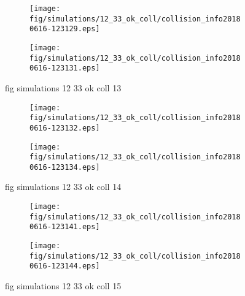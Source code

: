 \begin{figure}[H]
	\centering
	\begin{subfigure}[b]{0.8\textwidth}
		\texttt{[image: fig/simulations/12\_33\_ok\_coll/collision\_info20180616-123129.eps]}
		\caption{}
		\label{fig:simulations:12_33_ok_coll:collision_info20180616-123129}
	\end{subfigure}

	\begin{subfigure}[b]{0.8\textwidth}
		\texttt{[image: fig/simulations/12\_33\_ok\_coll/collision\_info20180616-123131.eps]}
		\caption{}
		\label{fig:simulations:12_33_ok_coll:collision_info20180616-123131}
	\end{subfigure}
	\caption{fig simulations 12 33 ok coll 13}
	\label{fig:simulations:12_33_ok_coll:13}
\end{figure}

\begin{figure}[H]
	\centering
	\begin{subfigure}[b]{0.8\textwidth}
		\texttt{[image: fig/simulations/12\_33\_ok\_coll/collision\_info20180616-123132.eps]}
		\caption{}
		\label{fig:simulations:12_33_ok_coll:collision_info20180616-123132}
	\end{subfigure}

	\begin{subfigure}[b]{0.8\textwidth}
		\texttt{[image: fig/simulations/12\_33\_ok\_coll/collision\_info20180616-123134.eps]}
		\caption{}
		\label{fig:simulations:12_33_ok_coll:collision_info20180616-123134}
	\end{subfigure}
	\caption{fig simulations 12 33 ok coll 14}
	\label{fig:simulations:12_33_ok_coll:14}
\end{figure}

\begin{figure}[H]
	\centering
	\begin{subfigure}[b]{0.8\textwidth}
		\texttt{[image: fig/simulations/12\_33\_ok\_coll/collision\_info20180616-123141.eps]}
		\caption{}
		\label{fig:simulations:12_33_ok_coll:collision_info20180616-123141}
	\end{subfigure}

	\begin{subfigure}[b]{0.8\textwidth}
		\texttt{[image: fig/simulations/12\_33\_ok\_coll/collision\_info20180616-123144.eps]}
		\caption{}
		\label{fig:simulations:12_33_ok_coll:collision_info20180616-123144}
	\end{subfigure}
	\caption{fig simulations 12 33 ok coll 15}
	\label{fig:simulations:12_33_ok_coll:15}
\end{figure}

